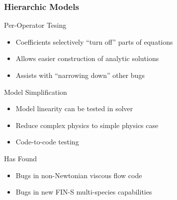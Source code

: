 \begin{frame}
\frametitle{Hierarchic Models}
\begin{block}{Per-Operator Tesing}
\begin{itemize}
\item Coefficients selectively ``turn off'' parts of equations
\item Allows easier construction of analytic solutions
\item Assists with ``narrowing down'' other bugs
\end{itemize}
\end{block}

\begin{block}{Model Simplification}
\begin{itemize}
\item Model linearity can be tested in solver
\item Reduce complex physics to simple physics case
\item Code-to-code testing
\end{itemize}
\end{block}

\pause

\begin{block}{Has Found}
\begin{itemize}
\item Bugs in non-Newtonian viscous flow code
\item Bugs in new FIN-S multi-species capabilities
\end{itemize}
\end{block}
\end{frame}


